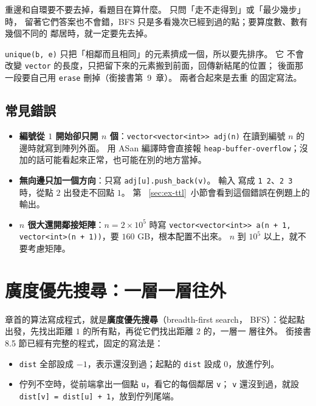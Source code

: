 重邊和自環要不要去掉，看題目在算什麼。 只問「走不走得到」或「最少幾步」時，
留著它們答案也不會錯，BFS 只是多看幾次已經到過的點；要算度數、數有幾個不同的
鄰居時，就一定要先去掉。

\begin{bridgerecap}
\texttt{unique(b, e)} 只把「相鄰而且相同」的元素擠成一個，所以要先排序。 它
不會改變 \texttt{vector} 的長度，只把留下來的元素搬到前面，回傳新結尾的位置；
後面那一段要自己用 \texttt{erase} 刪掉（銜接書第~9~章）。 兩者合起來是去重
的固定寫法。
\end{bridgerecap}

\subsection{常見錯誤}

\begin{itemize}
\item \textbf{編號從 $1$ 開始卻只開 $n$ 個}：\texttt{vector<vector<int>>
adj(n)} 在讀到編號 $n$ 的邊時就寫到陣列外面。 用 ASan 編譯時會直接報
\texttt{heap-buffer-overflow}；沒加的話可能看起來正常，也可能在別的地方當掉。
\item \textbf{無向邊只加一個方向}：只寫 \texttt{adj[u].push\_back(v)}。 輸入
寫成 \texttt{1 2}、\texttt{2 3} 時，從點 $2$ 出發走不回點 $1$。 第
~\ref{sec:ex-ttl}~小節會看到這個錯誤在例題上的輸出。
\item \textbf{$n$ 很大還開鄰接矩陣}：$n = 2 \times 10^5$ 時寫 \texttt{vector<vector<int>>
a(n + 1, vector<int>(n + 1))}，要 $160$ GB，根本配置不出來。 $n$ 到 $10^5$ 以上，就不要考慮矩陣。
\end{itemize}

\section{廣度優先搜尋：一層一層往外}
\label{sec:bfs}

章首的算法寫成程式，就是\textbf{廣度優先搜尋}（breadth-first search，
BFS）：從起點出發，先找出距離 $1$ 的所有點，再從它們找出距離 $2$ 的，一層一
層往外。 銜接書 8.5 節已經有完整的程式，固定的寫法是：

\begin{itemize}
\item \texttt{dist} 全部設成 $-1$，表示還沒到過；起點的 \texttt{dist} 設成
$0$，放進佇列。
\item 佇列不空時，從前端拿出一個點 \texttt{u}，看它的每個鄰居 \texttt{v}；
\texttt{v} 還沒到過，就設 \texttt{dist[v] = dist[u] + 1}，放到佇列尾端。
\end{itemize}

